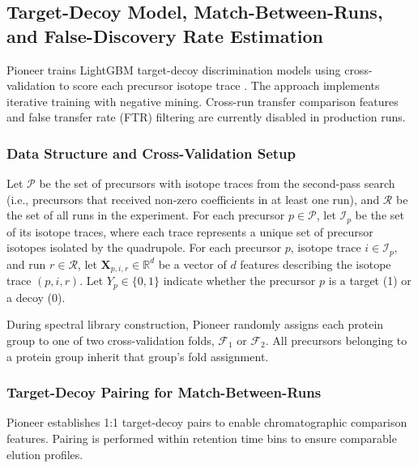 \documentclass[pdflatex,sn-nature]{sn-jnl}
\begin{document}
\subsection{Target-Decoy Model, Match-Between-Runs, and False-Discovery Rate Estimation}\label{subsec:target-decoy-mbr-fdr}

Pioneer trains LightGBM target-decoy discrimination models using cross-validation to score each precursor isotope trace \cite{LightGBM paper...}. The approach implements iterative training with negative mining. Cross-run transfer comparison features and false transfer rate (FTR) filtering are currently disabled in production runs.

\subsubsection{Data Structure and Cross-Validation Setup}\label{subsubsec:data-structure-cv-setup}

Let $\mathcal{P}$ be the set of precursors with isotope traces from the second-pass search (i.e., precursors that received non-zero coefficients in at least one run), and $\mathcal{R}$ be the set of all runs in the experiment. For each precursor $p \in \mathcal{P}$, let $\mathcal{I}_p$ be the set of its isotope traces, where each trace represents a unique set of precursor isotopes isolated by the quadrupole. For each precursor $p$, isotope trace $i \in \mathcal{I}_p$, and run $r \in \mathcal{R}$, let $\mathbf{X}_{p,i,r} \in \mathbb{R}^d$ be a vector of $d$ features describing the isotope trace $(p,i,r)$. Let $Y_p \in \{0,1\}$ indicate whether the precursor $p$ is a target (1) or a decoy (0).

During spectral library construction, Pioneer randomly assigns each protein group to one of two cross-validation folds, $\mathcal{F}_1$ or $\mathcal{F}_2$. All precursors belonging to a protein group inherit that group's fold assignment.

\subsubsection{Target-Decoy Pairing for Match-Between-Runs}\label{subsubsec:target-decoy-pairing}

Pioneer establishes 1:1 target-decoy pairs to enable chromatographic comparison features. Pairing is performed within retention time bins to ensure comparable elution profiles.
\end{document}
